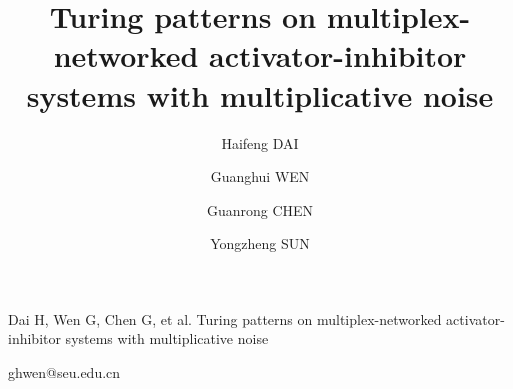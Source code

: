 \documentclass{SCIS2026}
\begin{document}
\DOI{}
\ArtNo{}
\ReceiveDate{}
\ReviseDate{}
\AcceptDate{}
\OnlineDate{}
\AuthorMark{}
\AuthorCitation{}

\title{Turing patterns on multiplex-networked activator-inhibitor systems with multiplicative noise}{Dai H, Wen G, Chen G, et al. Turing patterns on multiplex-networked activator-inhibitor systems with multiplicative noise}

\author[1,2]{Haifeng DAI}{}
\author[3]{Guanghui WEN}{{ghwen@seu.edu.cn}}
\author[2]{Guanrong CHEN}{}
\author[4,5]{Yongzheng SUN}{}


\address[1]{School of Cyber Science and Engineering, Southeast University, Nanjing 210096, China}
\address[2]{Department of Electrical Engineering, City University of Hong Kong, Hong Kong SAR 999077, China}
\address[3]{School of Automation, Southeast University, Nanjing 210096, China}
\address[4]{School of Mathematics, China University of Mining and Technology, Xuzhou 221008, China}
\address[5]{Shenzhen Research Institute, China University of Mining and Technology, Shenzhen 518057, China}
\end{document}
